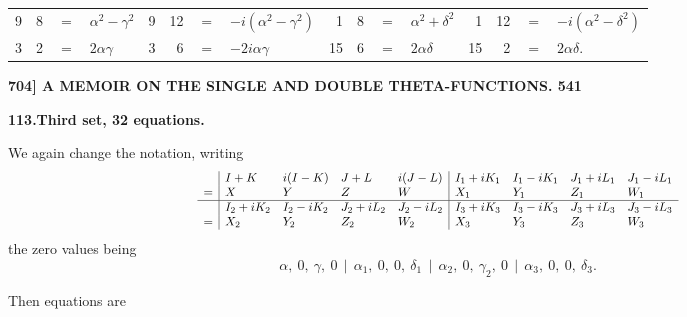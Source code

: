 \documentclass[11pt]{article}
\begin{document}
{\begin{center}
\begin{tabular}{rrcrl||rrcrl||rrcrl||rrcrl}
9 & 8 & $=$ & \multicolumn{2}{l||}{$\alpha^2 - \gamma^2$} & 9 & 12 & $=$ & \multicolumn{2}{l||}{$-i(\alpha^2 - \gamma^2)$} & 1 & 8 & $=$ & \multicolumn{2}{l||}{$\alpha^2 + \delta^2$} & 1 & 12 & $=$ & \multicolumn{2}{l}{$-i(\alpha^2 - \delta^2)$}\\
3 & 2 & $=$ & \multicolumn{2}{l||}{$2\alpha\gamma$} & 3 & 6 & $=$ & \multicolumn{2}{l||}{$-2i\alpha\gamma$} & 15 & 6 & $=$ & \multicolumn{2}{l||}{$2\alpha\delta$} & 15 & 2 & $=$ & \multicolumn{2}{l}{$2\alpha\delta$.}\\
\end{tabular}
\end{center}
}

\newpage
\noindent\textbf{704] \quad A MEMOIR ON THE SINGLE AND DOUBLE THETA-FUNCTIONS. \hfill 541}

\medskip
\begin{center}\textbf{113.\quad Third set, 32 equations.}\end{center}

We again change the notation, writing
\[
\resizebox{\textwidth}{!}{$\displaystyle
\begin{array}{l|llll|llll}
& I+K & i(I-K) & J+L & i(J-L) & I_1+iK_1 & I_1-iK_1 & J_1+iL_1 & J_1-iL_1\\
= & X & Y & Z & W & X_1 & Y_1 & Z_1 & W_1\\\hline
& I_2+iK_2 & I_2-iK_2 & J_2+iL_2 & J_2-iL_2 & I_3+iK_3 & I_3-iK_3 & J_3+iL_3 & J_3-iL_3\\
= & X_2 & Y_2 & Z_2 & W_2 & X_3 & Y_3 & Z_3 & W_3\\
\end{array}
$}
\]
the zero values being
\[
\alpha,\ 0,\ \gamma,\ 0\ \ |\ \ \alpha_1,\ 0,\ 0,\ \delta_1\ \ |\ \ \alpha_2,\ 0,\ \gamma_2,\ 0\ \ |\ \ \alpha_3,\ 0,\ 0,\ \delta_3.
\]

Then equations are
\end{document}
